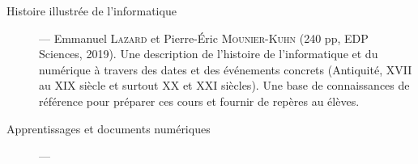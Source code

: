 \begin{description}
\item[Histoire illustrée de l'informatique] --- 
Emmanuel \textsc{Lazard} et Pierre-Éric \textsc{Mounier-Kuhn} (240 pp, EDP Sciences, 2019). Une description de l’histoire de l’informatique et du numérique à travers des dates et des événements concrets (Antiquité, XVII au XIX siècle et surtout XX et XXI siècles). Une base de connaissances de référence pour préparer ces cours et fournir de repères au élèves.
\item[Apprentissages et documents numériques] --- 

\end{description}
